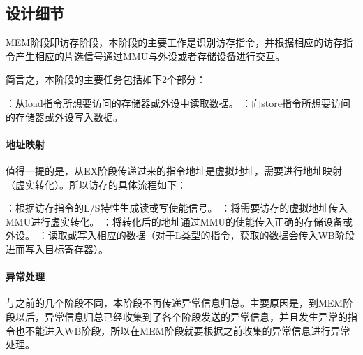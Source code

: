     \subsection{设计细节}
    MEM阶段即访存阶段，本阶段的主要工作是识别访存指令，并根据相应的访存指令产生相应的片选信号通过MMU与外设或者存储设备进行交互。

    简言之，本阶段的主要任务包括如下2个部分：
    \begin{enumerate}
        ：从load指令所想要访问的存储器或外设中读取数据。
        ：向store指令所想要访问的存储器或外设写入数据。
    \end{enumerate}

        \paragraph{地址映射}
        值得一提的是，从EX阶段传递过来的指令地址是虚拟地址，需要进行地址映射（虚实转化）。所以访存的具体流程如下：
        \begin{enumerate}
            ：根据访存指令的L/S特性生成读或写使能信号。
            ：将需要访存的虚拟地址传入MMU进行虚实转化。
            ：将转化后的地址通过MMU的使能传入正确的存储设备或外设。
            ：读取或写入相应的数据（对于L类型的指令，获取的数据会传入WB阶段进而写入目标寄存器）。
        \end{enumerate}

        \paragraph{异常处理}
        与之前的几个阶段不同，本阶段不再传递异常信息归总。主要原因是，到MEM阶段以后，异常信息归总已经收集到了各个阶段发送的异常信息，并且发生异常的指令也不能进入WB阶段，所以在MEM阶段就要根据之前收集的异常信息进行异常处理。

